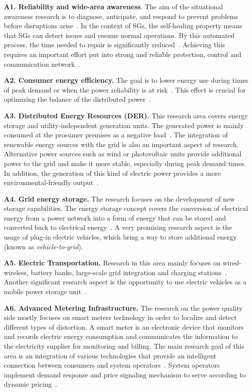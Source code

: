 \documentclass[1p]{elsarticle} %
\begin{document}
\noindent \textbf{A1. Reliability and wide-area awareness}. The aim of the situational awareness research is to diagnose, anticipate, and respond to prevent problems before disruptions arise~\citep{ref:cintuglu2017survey,NIST2010}. In the context of SGs, the self-healing property means that SGs can detect issues and resume normal operations. By this automated process, the time needed to repair is significantly reduced~\citep{Amin2008,Beidou2010}. Achieving this requires an important effort put into strong and reliable protection, control and communication network~\citep{Amin2008}.

\noindent \textbf{A2. Consumer energy efficiency.} The goal is to lower energy use during times of peak demand or when the power reliability is at risk~\citep{ref:cintuglu2017survey}. This effect is crucial for optimizing the balance of the distributed power~\citep{NIST2010}.

\noindent \textbf{A3. Distributed   Energy   Resources   (DER).} This research area covers energy storage and utility-independent generation units. The generated power is mainly consumed at the prosumer premises as a negative load~\citep{ref:cintuglu2017survey,NIST2010}. The integration of renewable energy sources with the grid is also an important aspect of research. Alternative power sources such as wind or photovoltaic units provide additional power to the grid and make it more stable, especially during peak demand times. In addition, the generation of this kind of electric power provides a more environmental-friendly output~\citep{Beidou2010}.


\noindent \textbf{A4. Grid energy storage.} The research focuses on the development of new storage capabilities. The energy storage concept covers the conversion of electrical energy from a power network into a form of energy that can be stored and converted back to electrical energy~\citep{Mohd,ref:cintuglu2017survey,NIST2010}. A very promising research aspect is the usage of plug-in electric vehicles, which bring a way to store additional energy (known as \textit{vehicle-to-grid}).

\noindent \textbf{A5. Electric Transportation.} Research in this area mainly focuses on wired-wireless, battery banks, large-scale grid integration and charging stations~\citep{ref:cintuglu2017survey}. Another significant research aspect is the opportunity to use electric vehicles as a mobile power storage unit~\citep{NIST2010}.

\noindent \textbf{A6. Advanced Metering Infrastructure.} The research on the power quality side mostly focuses on smart meters technology in order to localize and detect different types of distortion. A smart meter is an electronic device that monitors and records electric energy consumption and communicates the information to the electricity supplier for monitoring and billing. %
The main research goal of this area is an integration of various technologies that provide an intelligent connection between consumers and system operators~\citep{Zhang}. System operators implement demand response and price signaling mechanism to serve according to dynamic pricing~\citep{ref:cintuglu2017survey,NIST2010}.
\end{document}
